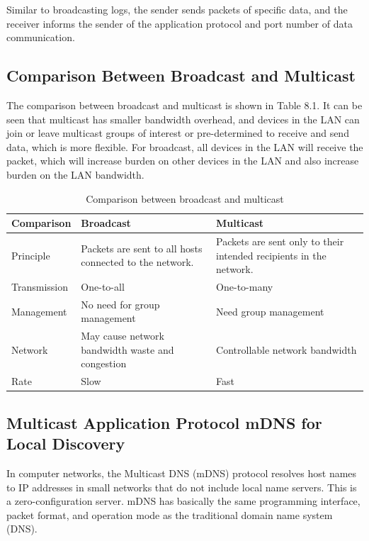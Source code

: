 \documentclass[a4paper,12pt,openany]{book}
\renewcommand{\arraystretch}{1}
\begin{document}
\vspace{6pt}
Similar to broadcasting logs, the sender sends packets of specific data, and the receiver informs the sender of the application protocol and port number of data communication.

\subsection{Comparison Between Broadcast and Multicast}
The comparison between broadcast and multicast is shown in Table 8.1. It can be seen that multicast has smaller bandwidth overhead, and devices in the LAN can join or leave multicast groups of interest or pre-determined to receive and send data, which is more flexible. For broadcast, all devices in the LAN will receive the packet, which will increase burden on other devices in the LAN and also increase burden on the LAN bandwidth.

\begin{table}[h!]
    \renewcommand{\arraystretch}{1.4}
    \caption{Comparison between broadcast and multicast}
    \begin{tabular}{|>{\Centering}m{6em}|>{\Centering}m{16em}|>{\Centering}m{16em}|}
        \hline
        \rowcolor{LightBlue} \textbf{Comparison}&\textbf{Broadcast}&\textbf{Multicast}\\
        \hline
        Principle&Packets are sent to all hosts connected to the network.&Packets are sent only to their intended recipients in the network.\\
        \hline
        Transmission&One-to-all&One-to-many\\
        \hline
        Management&No need for group management&Need group management\\
        \hline
        Network&May cause network bandwidth waste and congestion&Controllable network bandwidth\\
        \hline
        Rate&Slow&Fast\\
        \hline
    \end{tabular}
\end{table}

\subsection{Multicast Application Protocol mDNS for Local Discovery}
In computer networks, the Multicast DNS (mDNS) protocol resolves host names to IP addresses in small networks that do not include local name servers. This is a zero-configuration server. mDNS has basically the same programming interface, packet format, and operation mode as the traditional domain name system (DNS).
\end{document}
